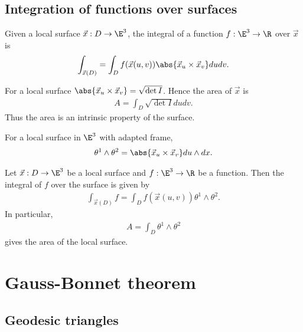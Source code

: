 \documentclass{article}
\begin{document}
\subsection{Integration of functions over surfaces}

\begin{definition}
	Given a local surface $\vec x:D\to\E^3$, the integral of a
	function $f:\E^3\to\R$ over $\vec x$ is
	\begin{align*}
		\int_{\vec x(D)} = \int_D f(\vec x(u,v))\abs{\vec x_u \times \vec x_v}dudv.
	\end{align*}
\end{definition}

\begin{lemma}[Notes 14.15]
	For a local surface $\abs{\vec x_u \times \vec x_v}=\sqrt{\det I}$. Hence the area
	of $\vec x$ is
	\begin{align*}
		A = \int_D \sqrt{\det I}dudv.
	\end{align*}
	Thus the area is an intrinsic property of the surface.
\end{lemma}

\begin{lemma}[Notes 14.16]
	For a local surface in $\E^3$ with adapted frame,
	\begin{align*}
		\theta^1\wedge\theta^2 = \abs{\vec x_u \times \vec x_v} du \wedge dx.
	\end{align*}
\end{lemma}

\begin{corollary}[Notes 14.17]
	Let $\vec x: D\to\E^3$ be a local surface and $f:\E^3\to\R$ be a function. Then
	the integral of $f$ over the surface is given by
	\begin{align*}
		\int_{\vec x(D)} f = \int_D f(\vec x(u,v))\theta^1\wedge\theta^2.
	\end{align*}
	In particular,
	\begin{align*}
		A = \int_D \theta^1\wedge\theta^2
	\end{align*}
	gives the area of the local surface.
\end{corollary}

\section{Gauss-Bonnet theorem}

\subsection{Geodesic triangles}
\end{document}
